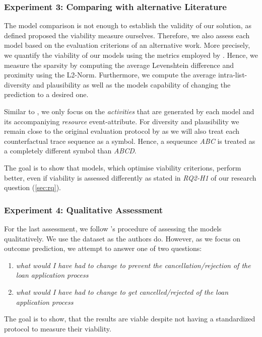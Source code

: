\documentclass[./../../paper.tex]{subfiles}
\begin{document}
\subsubsection{Experiment 3: Comparing with alternative Literature}
The model comparison is not enough to establish the validity of our solution, as defined proposed the viability measure ourselves. Therefore, we also assess each model based on the evaluation criterions of an alternative work. More precisely, we quantify the viability of our models using the metrics employed by \citeauthor{hsieh_DiCE4ELInterpretingProcess_2021}. Hence, we measure the sparsity by computing the average Levenshtein difference and proximity using the L2-Norm. Furthermore, we compute the average intra-list-diversity and plausibility as well as the models capability of changing the prediction to a desired one. 

Similar to \citeauthor{hsieh_DiCE4ELInterpretingProcess_2021}, we only focus on the \emph{activities} that are generated by each model and its accompaniying \emph{resource} event-attribute. For diversity and plausibility we remain close to the original evaluation protocol by \citeauthor{hsieh_DiCE4ELInterpretingProcess_2021} as we will also treat each counterfactual trace sequence as a symbol. Hence, a sequeunce \emph{ABC} is treated as a completely different symbol than \emph{ABCD}.

The goal is to show that models, which optimise viability criterions, perform better, even if viability is assessed differently as stated in \emph{RQ2-H1} of our research question (\autoref{sec:rq}). 

\subsubsection{Experiment 4: Qualitative Assessment}
For the last assessment, we follow \citeauthor{hsieh_DiCE4ELInterpretingProcess_2021}'s procedure of assessing the models qualitatively. We use the dataset as the authors do.  However, as we focus on outcome prediction, we attempt to answer one of two questions: 

\begin{enumerate}
    \item \emph{what would I have had to change to prevent the cancellation/rejection of the loan application process}
    \item \emph{what would I have had to change to get cancelled/rejected of the loan application process}
\end{enumerate}

\noindent The goal is to show, that the results are viable despite not having a standardized protocol to measure their viability.
\end{document}
